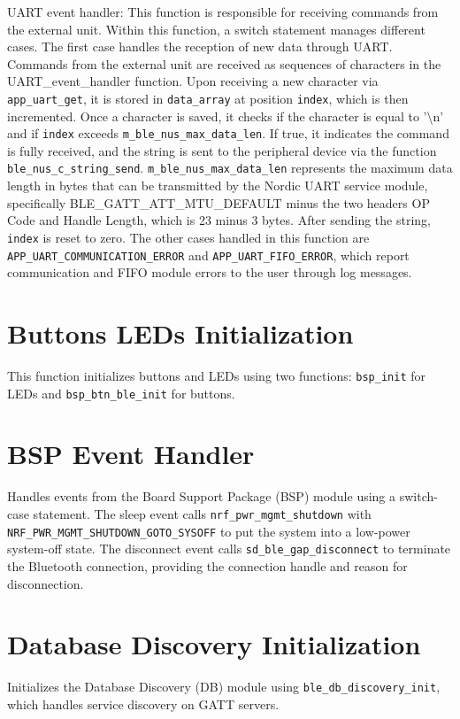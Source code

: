 \documentclass{Configuration_Files/PoliMi3i_thesis}
\begin{document}
UART event handler: This function is responsible for receiving commands from the external unit. Within this function, a switch statement manages different cases. The first case handles the reception of new data through UART. Commands from the external unit are received as sequences of characters in the UART\_event\_handler function. Upon receiving a new character via \texttt{app\_uart\_get}, it is stored in \texttt{data\_array} at position \texttt{index}, which is then incremented. Once a character is saved, it checks if the character is equal to '\textbackslash n' and if \texttt{index} exceeds \texttt{m\_ble\_nus\_max\_data\_len}. If true, it indicates the command is fully received, and the string is sent to the peripheral device via the function \texttt{ble\_nus\_c\_string\_send}. \texttt{m\_ble\_nus\_max\_data\_len} represents the maximum data length in bytes that can be transmitted by the Nordic UART service module, specifically BLE\_GATT\_ATT\_MTU\_DEFAULT minus the two headers OP Code and Handle Length, which is 23 minus 3 bytes. After sending the string, \texttt{index} is reset to zero. The other cases handled in this function are \texttt{APP\_UART\_COMMUNICATION\_ERROR} and \texttt{APP\_UART\_FIFO\_ERROR}, which report communication and FIFO module errors to the user through log messages.

\section*{Buttons LEDs Initialization}
This function initializes buttons and LEDs using two functions: \texttt{bsp\_init} for LEDs and \texttt{bsp\_btn\_ble\_init} for buttons.

\section*{BSP Event Handler}
Handles events from the Board Support Package (BSP) module using a switch-case statement. The sleep event calls \texttt{nrf\_pwr\_mgmt\_shutdown} with \texttt{NRF\_PWR\_MGMT\_SHUTDOWN\_GOTO\_SYSOFF} to put the system into a low-power system-off state. The disconnect event calls \texttt{sd\_ble\_gap\_disconnect} to terminate the Bluetooth connection, providing the connection handle and reason for disconnection.

\section*{Database Discovery Initialization}
Initializes the Database Discovery (DB) module using \texttt{ble\_db\_discovery\_init}, which handles service discovery on GATT servers.
\end{document}
